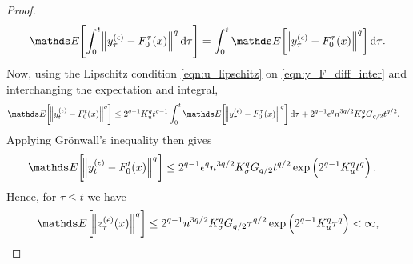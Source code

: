 \begin{proof}
	\begin{equation*}
		\avg{\int_0^{t}{\norm{y_\tau^{(\epsilon)} - F_0^\tau(x)}^q\dif\tau}} = \int_0^{t}{\avg{\norm{y_\tau^{(\epsilon)} - F_0^\tau(x)}^q}\dif\tau}.
		\label{eqn:y_tonelli}
	\end{equation*}
	Now, using the Lipschitz condition \eqref{eqn:u_lipschitz} on \eqref{eqn:y_F_diff_inter} and interchanging the expectation and integral,
	\begin{align*}
		\avg{\norm{y_t^{(\epsilon)} - F_0^t(x)}^q} %
		 & \leq 2^{q-1} K_u^q t^{q-1} \int_0^{t}{\avg{\norm{y_\tau^{(\epsilon)} - F_0^{\tau}(x)}^q}\dif\tau} + 2^{q-1}\epsilon^q n^{3q/2}K_\sigma^q G_{q/2} t^{q/2}.
	\end{align*}
	Applying Gr\"{o}nwall's inequality then gives
	\begin{align*}
		\avg{\norm{y_t^{(\epsilon)} - F_0^t(x)}^q} %
		 & \leq 2^{q-1}\epsilon^q n^{3q/2}K_\sigma^q G_{q/2} t^{q/2}\exp\left(2^{q-1} K_u^q t^q\right).
	\end{align*}
	Hence, for \(\tau \leq t\) we have
	\begin{equation*}
		\avg{\norm{z_\tau^{(\epsilon)}(x)}^q} \leq 2^{q-1} n^{3q/2}K_\sigma^q G_{q/2} \tau^{q/2}\exp\left(2^{q-1} K_u^q \tau^q\right)< \infty,
		\label{eqn:z_exp_finite}
	\end{equation*}

\end{proof}
